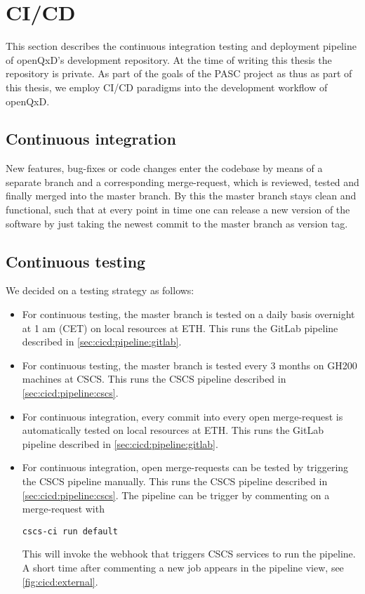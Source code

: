 
\chapter{CI/CD}
\label{ch:p1:cicd}

This section describes the continuous integration testing and deployment pipeline of openQxD's development repository\cite{gitlab:openqxd-devel}. At the time of writing this thesis the repository is private. As part of the goals of the PASC project\cite{pasc:project} as thus as part of this thesis, we employ CI/CD paradigms into the development workflow of openQxD.

\section{Continuous integration}

New features, bug-fixes or code changes enter the codebase by means of a separate branch and a corresponding merge-request, which is reviewed, tested and finally merged into the master branch. By this the master branch stays clean and functional, such that at every point in time one can release a new version of the software by just taking the newest commit to the master branch as version tag.

\section{Continuous testing}
\label{sec:cicd:testing}

We decided on a testing strategy as follows:

\begin{itemize}
    \item For continuous testing, the master branch is tested on a daily basis overnight at 1 am (CET) on local resources at ETH. This runs the GitLab pipeline described in \cref{sec:cicd:pipeline:gitlab}.
    \item For continuous testing, the master branch is tested every 3 months on GH200 machines at CSCS. This runs the CSCS pipeline described in \cref{sec:cicd:pipeline:cscs}.
    \item For continuous integration, every commit into every open merge-request is automatically tested on local resources at ETH. This runs the GitLab pipeline described in \cref{sec:cicd:pipeline:gitlab}.
    \item{For continuous integration, open merge-requests can be tested by triggering the CSCS pipeline manually. This runs the CSCS pipeline described in \cref{sec:cicd:pipeline:cscs}. The pipeline can be trigger by commenting on a merge-request with
    \begin{verbatim}
cscs-ci run default
    \end{verbatim}
    This will invoke the webhook that triggers CSCS services to run the pipeline. A short time after commenting a new job appears in the pipeline view, see \cref{fig:cicd:external}.}
\end{itemize}

